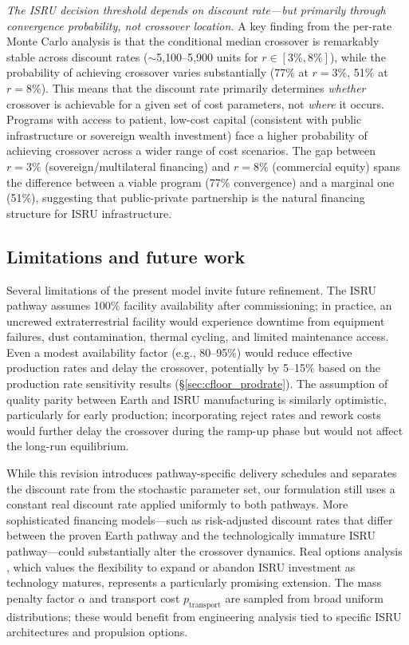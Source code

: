\documentclass[preprint,12pt]{elsarticle}
\begin{document}
\emph{The ISRU decision threshold depends on discount rate---but primarily through convergence probability, not crossover location.} A key finding from the per-rate Monte Carlo analysis is that the conditional median crossover is remarkably stable across discount rates ($\sim$5{,}100--5{,}900 units for $r \in [3\%, 8\%]$), while the probability of achieving crossover varies substantially (77\% at $r = 3\%$, 51\% at $r = 8\%$). This means that the discount rate primarily determines \emph{whether} crossover is achievable for a given set of cost parameters, not \emph{where} it occurs. Programs with access to patient, low-cost capital (consistent with public infrastructure or sovereign wealth investment) face a higher probability of achieving crossover across a wider range of cost scenarios. The gap between $r = 3\%$ (sovereign/multilateral financing) and $r = 8\%$ (commercial equity) spans the difference between a viable program (77\% convergence) and a marginal one (51\%), suggesting that public-private partnership is the natural financing structure for ISRU infrastructure.

\subsection{Limitations and future work}

Several limitations of the present model invite future refinement. The ISRU pathway assumes 100\% facility availability after commissioning; in practice, an uncrewed extraterrestrial facility would experience downtime from equipment failures, dust contamination, thermal cycling, and limited maintenance access. Even a modest availability factor (e.g., 80--95\%) would reduce effective production rates and delay the crossover, potentially by 5--15\% based on the production rate sensitivity results (\S\ref{sec:cfloor_prodrate}). The assumption of quality parity between Earth and ISRU manufacturing is similarly optimistic, particularly for early production; incorporating reject rates and rework costs would further delay the crossover during the ramp-up phase but would not affect the long-run equilibrium.

While this revision introduces pathway-specific delivery schedules and separates the discount rate from the stochastic parameter set, our formulation still uses a constant real discount rate applied uniformly to both pathways. More sophisticated financing models---such as risk-adjusted discount rates that differ between the proven Earth pathway and the technologically immature ISRU pathway---could substantially alter the crossover dynamics. Real options analysis \cite{dixit1994}, which values the flexibility to expand or abandon ISRU investment as technology matures, represents a particularly promising extension. The mass penalty factor $\alpha$ and transport cost $p_{\mathrm{transport}}$ are sampled from broad uniform distributions; these would benefit from engineering analysis tied to specific ISRU architectures and propulsion options.
\end{document}

